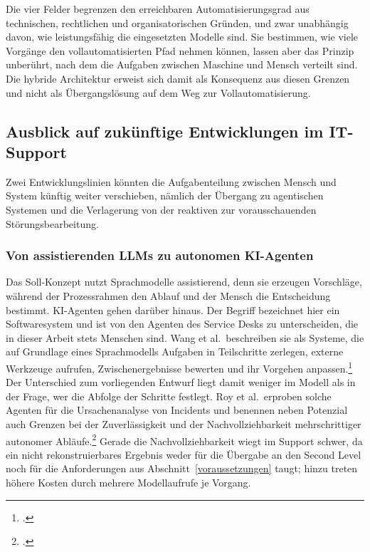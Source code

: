 Die vier Felder begrenzen den erreichbaren Automatisierungsgrad aus technischen, rechtlichen und organisatorischen Gr\"unden, und zwar unabh\"angig davon, wie leistungsf\"ahig die eingesetzten Modelle sind. Sie bestimmen, wie viele Vorg\"ange den vollautomatisierten Pfad nehmen k\"onnen, lassen aber das Prinzip unber\"uhrt, nach dem die Aufgaben zwischen Maschine und Mensch verteilt sind. Die hybride Architektur erweist sich damit als Konsequenz aus diesen Grenzen und nicht als \"Ubergangsl\"osung auf dem Weg zur Vollautomatisierung.

\subsection{Ausblick auf zukünftige Entwicklungen im IT-Support}
\label{ausblick}

Zwei Entwicklungslinien k\"onnten die Aufgabenteilung zwischen Mensch und System k\"unftig weiter verschieben, n\"amlich der \"Ubergang zu agentischen Systemen und die Verlagerung von der reaktiven zur vorausschauenden St\"orungsbearbeitung.

\subsubsection{Von assistierenden LLMs zu autonomen KI-Agenten}
\label{kiAgenten}

Das Soll-Konzept nutzt Sprachmodelle assistierend, denn sie erzeugen Vorschl\"age, w\"ahrend der Prozessrahmen den Ablauf und der Mensch die Entscheidung bestimmt. KI-Agenten gehen dar\"uber hinaus. Der Begriff bezeichnet hier ein Softwaresystem und ist von den Agenten des Service Desks zu unterscheiden, die in dieser Arbeit stets Menschen sind. Wang et al.~beschreiben sie als Systeme, die auf Grundlage eines Sprachmodells Aufgaben in Teilschritte zerlegen, externe Werkzeuge aufrufen, Zwischenergebnisse bewerten und ihr Vorgehen anpassen.\footcite[Vgl.][S.~4]{Wang2024} Der Unterschied zum vorliegenden Entwurf liegt damit weniger im Modell als in der Frage, wer die Abfolge der Schritte festlegt. Roy et al.~erproben solche Agenten f\"ur die Ursachenanalyse von Incidents und benennen neben Potenzial auch Grenzen bei der Zuverl\"assigkeit und der Nachvollziehbarkeit mehrschrittiger autonomer Abl\"aufe.\footcite[Vgl.][hier S.~209]{Roy2024} Gerade die Nachvollziehbarkeit wiegt im Support schwer, da ein nicht rekonstruierbares Ergebnis weder f\"ur die \"Ubergabe an den Second Level noch f\"ur die Anforderungen aus Abschnitt~\ref{voraussetzungen} taugt; hinzu treten h\"ohere Kosten durch mehrere Modellaufrufe je Vorgang.

